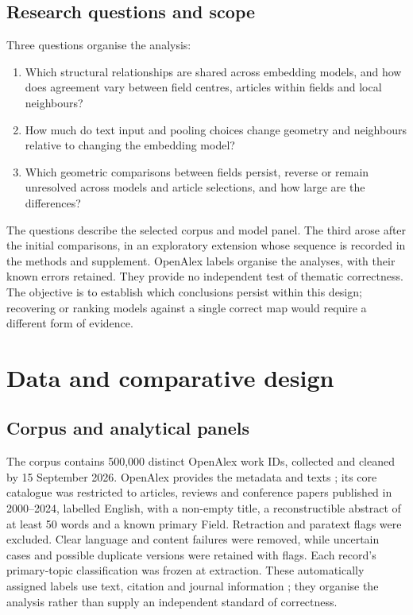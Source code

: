 \documentclass[12pt]{article}
\begin{document}
\subsection{Research questions and scope}
Three questions organise the analysis:

\begin{enumerate}
\item[\textbf{RQ1.}] Which structural relationships are shared across embedding models, and how does agreement vary between field centres, articles within fields and local neighbours?
\item[\textbf{RQ2.}] How much do text input and pooling choices change geometry and neighbours relative to changing the embedding model?
\item[\textbf{RQ3.}] Which geometric comparisons between fields persist, reverse or remain unresolved across models and article selections, and how large are the differences?
\end{enumerate}

The questions describe the selected corpus and model panel. The third arose after the initial comparisons, in an exploratory extension whose sequence is recorded in the methods and supplement. OpenAlex labels organise the analyses, with their known errors retained. They provide no independent test of thematic correctness. The objective is to establish which conclusions persist within this design; recovering or ranking models against a single correct map would require a different form of evidence.


\section{Data and comparative design}
\subsection{Corpus and analytical panels}
The corpus contains 500,000 distinct OpenAlex work IDs, collected and cleaned by 15 September 2026. OpenAlex provides the metadata and texts \citep{priem2022openalex}; its core catalogue was restricted to articles, reviews and conference papers published in 2000--2024, labelled English, with a non-empty title, a reconstructible abstract of at least 50 words and a known primary Field. Retraction and paratext flags were excluded. Clear language and content failures were removed, while uncertain cases and possible duplicate versions were retained with flags. Each record's primary-topic classification was frozen at extraction. These automatically assigned labels use text, citation and journal information \citep{openalex2026topics}; they organise the analysis rather than supply an independent standard of correctness.
\end{document}
